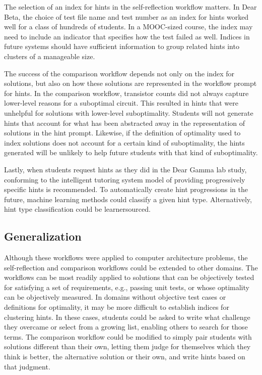 The selection of an index for hints in the self-reflection workflow matters. In Dear Beta, the choice of test file name and test number as an index for hints worked well for a class of hundreds of students. In a MOOC-sized course, the index may need to include an indicator that specifies how the test failed as well. Indices in future systems should have sufficient information to group related hints into clusters of a manageable size.

The success of the comparison workflow depends not only on the index for solutions, but also on how these solutions are represented in the workflow prompt for hints. In the comparison workflow, transistor counts did not always capture lower-level reasons for a suboptimal circuit. This resulted in hints that were unhelpful for solutions with lower-level suboptimality. Students will not generate hints that account for what has been abstracted away in the representation of solutions in the hint prompt. Likewise, if the definition of optimality used to index solutions does not account for a certain kind of suboptimality, the hints generated will be unlikely to help future students with that kind of suboptimality. 

Lastly, when students request hints as they did in the Dear Gamma lab study, conforming to the intelligent tutoring system model of providing progressively specific hints is recommended. To automatically create hint progressions in the future, machine learning methods could classify a given hint type. Alternatively, hint type classification could be learnersourced. 

\subsection{Generalization}
Although these workflows were applied to computer architecture problems, the self-reflection and comparison workflows could be extended to other domains. The workflows can be most readily applied to solutions that can be objectively tested for satisfying a set of requirements, e.g., passing unit tests, or whose optimality can be objectively measured. In domains without objective test cases or definitions for optimality, it may be more difficult to establish indices for clustering hints. In these cases, students could be asked to write what challenge they overcame or select from a growing list, enabling others to search for those terms. The comparison workflow could be modified to simply pair students with solutions different than their own, letting them judge for themselves which they think is better, the alternative solution or their own, and write hints based on that judgment.

